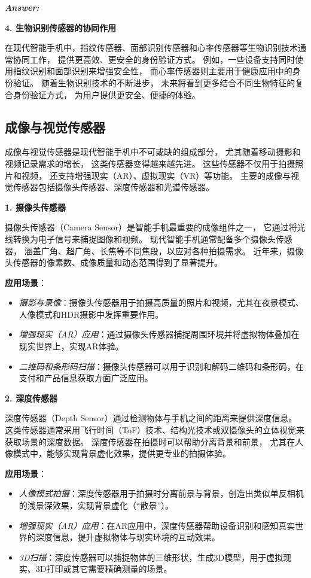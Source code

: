 \documentclass[12pt]{article}
\newenvironment{Answer}{
  \vspace{12pt}
  {\large\textbf{\textit{\hspace{-12pt}Answer:}}}\par
  \vspace{8pt}
} {\vspace{24pt}}
\begin{document}
\begin{Answer}
\noindent\textbf{4. 生物识别传感器的协同作用}\noindent

在现代智能手机中，指纹传感器、面部识别传感器和心率传感器等生物识别技术通常协同工作，
提供更高效、更安全的身份验证方式。
例如，一些设备支持同时使用指纹识别和面部识别来增强安全性，
而心率传感器则主要用于健康应用中的身份验证。
随着生物识别技术的不断进步，
未来将看到更多结合不同生物特征的复合身份验证方式，
为用户提供更安全、便捷的体验。

\subsection*{成像与视觉传感器}\noindent

成像与视觉传感器是现代智能手机中不可或缺的组成部分，
尤其随着移动摄影和视频记录需求的增长，
这类传感器变得越来越先进。
这些传感器不仅用于拍摄照片和视频，
还支持增强现实（AR）、虚拟现实（VR）等功能。
主要的成像与视觉传感器包括摄像头传感器、深度传感器和光谱传感器。

\noindent\textbf{1. 摄像头传感器}\noindent

摄像头传感器（Camera Sensor）是智能手机最重要的成像组件之一，
它通过将光线转换为电子信号来捕捉图像和视频。
现代智能手机通常配备多个摄像头传感器，
涵盖广角、超广角、长焦等不同焦段，以应对各种拍摄需求。
近年来，摄像头传感器的像素数、成像质量和动态范围得到了显著提升。

\textbf{应用场景}：
\begin{itemize}
    \item \textit{摄影与录像}：摄像头传感器用于拍摄高质量的照片和视频，尤其在夜景模式、人像模式和HDR摄影中发挥重要作用。
    \item \textit{增强现实（AR）应用}：通过摄像头传感器捕捉周围环境并将虚拟物体叠加在现实世界上，实现AR体验。
    \item \textit{二维码和条形码扫描}：摄像头传感器可以用于识别和解码二维码和条形码，在支付和产品信息获取方面广泛应用。
\end{itemize}

\noindent\textbf{2. 深度传感器}\noindent

深度传感器（Depth Sensor）通过检测物体与手机之间的距离来提供深度信息。
这类传感器通常采用飞行时间（ToF）技术、结构光技术或双摄像头的立体视觉来获取场景的深度数据。
深度传感器在拍摄时可以帮助分离背景和前景，
尤其在人像模式中，能够实现背景虚化效果，提供更专业的拍摄体验。

\textbf{应用场景}：
\begin{itemize}
    \item \textit{人像模式拍摄}：深度传感器用于拍摄时分离前景与背景，创造出类似单反相机的浅景深效果，实现背景虚化（“散景”）。
    \item \textit{增强现实（AR）应用}：在AR应用中，深度传感器帮助设备识别和感知真实世界的深度信息，提升虚拟物体与现实环境的互动效果。
    \item \textit{3D扫描}：深度传感器可以捕捉物体的三维形状，生成3D模型，用于虚拟现实、3D打印或其它需要精确测量的场景。
\end{itemize}


\end{Answer}
\end{document}
